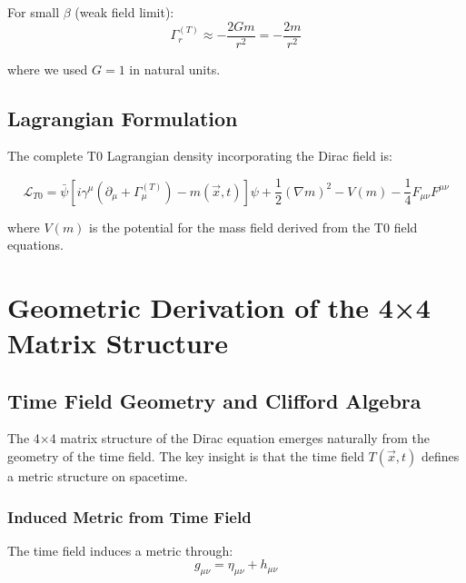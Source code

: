 \documentclass[12pt,a4paper]{article}
\newcommand{\Tfieldt}{T(\vec{x},t)}
\begin{document}
	For small $\beta$ (weak field limit):
	\begin{equation}
		\Gamma_{r}^{(T)} \approx -\frac{2Gm}{r^2} = -\frac{2m}{r^2}
		\label{eq:weak_field_connection}
	\end{equation}
	
	where we used $G = 1$ in natural units.
	
	\subsection{Lagrangian Formulation}
	\label{subsec:lagrangian_formulation}
	
	The complete T0 Lagrangian density incorporating the Dirac field is:
	
	\begin{equation}
		\mathcal{L}_{T0} = \bar{\psi}[i\gamma^{\mu}(\partial_{\mu} + \Gamma_{\mu}^{(T)}) - m(\vec{x},t)]\psi + \frac{1}{2}(\nabla m)^2 - V(m) - \frac{1}{4}F_{\mu\nu}F^{\mu\nu}
		\label{eq:t0_lagrangian}
	\end{equation}
	
	where $V(m)$ is the potential for the mass field derived from the T0 field equations.
	
	\section{Geometric Derivation of the 4×4 Matrix Structure}
	\label{sec:matrix_structure_geometric}
	
	\subsection{Time Field Geometry and Clifford Algebra}
	\label{subsec:time_field_geometry}
	
	The 4×4 matrix structure of the Dirac equation emerges naturally from the geometry of the time field. The key insight is that the time field $\Tfieldt$ defines a metric structure on spacetime.
	
	\subsubsection{Induced Metric from Time Field}
	\label{subsubsec:induced_metric}
	
	The time field induces a metric through:
	\begin{equation}
		g_{\mu\nu} = \eta_{\mu\nu} + h_{\mu\nu}
		\label{eq:induced_metric}
	\end{equation}
	
\end{document}
